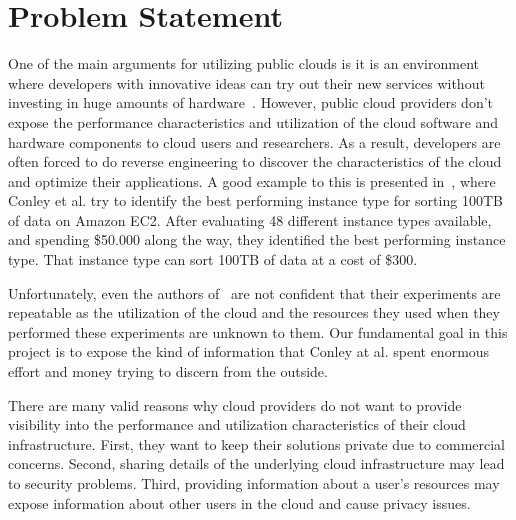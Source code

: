 \section{Problem Statement}
\label{sec:ProblemStatement}

%

One of the main arguments for utilizing public clouds is it is an environment where developers with innovative ideas can try out their new services without investing in huge amounts of hardware~\cite{Armbrust2009}. However, public cloud providers don't expose the performance characteristics and utilization of the cloud software and hardware components to cloud users and researchers. As a result, developers are often forced to do reverse engineering to discover the characteristics of the cloud and optimize their applications. A good example to this is presented in~\cite{conley2015achieving}, where Conley et al. try to identify the best performing instance type for sorting 100TB of data on Amazon EC2. After evaluating 48 different instance types available, and spending \$50.000 along the way, they identified the best performing instance type. That instance type can sort 100TB of data at a cost of \$300. 

Unfortunately, even the authors of~\cite{conley2015achieving} are not confident that their experiments are repeatable as the utilization of the cloud and the resources they used when they performed these experiments are unknown to them. Our fundamental goal in this project is to expose the kind of information that Conley at al. spent enormous effort and money trying to discern from the outside. 

There are many valid reasons why cloud providers do not want to provide visibility into the performance and utilization characteristics of their cloud infrastructure. First, they want to keep their solutions private due to commercial concerns. Second, sharing details of the underlying cloud infrastructure may lead to security problems. Third, providing information about a user's resources may expose information about other users in the cloud and cause privacy issues. 

